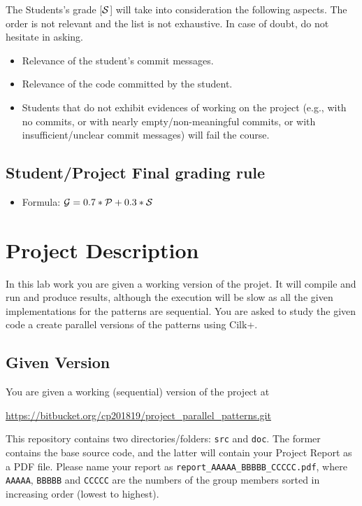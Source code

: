 \documentclass[11pt]{article}
\begin{document}
The Students's grade [$\cal{S}$] will take into consideration the following aspects.  The order is not relevant and the list is not exhaustive. In case of doubt, do not hesitate in asking.

\begin{itemize}
  \item Relevance of the student's commit messages.
  \item Relevance of the code committed by the student.
  \item Students that do not exhibit evidences of working on the project (e.g., with no commits, or with nearly empty/non-meaningful commits, or with insufficient/unclear commit messages) will fail the course.
\end{itemize}


\subsection{Student/Project Final grading rule}

\begin{itemize}
  \item Formula: ${\cal G} = 0.7 * {\cal P} + 0.3 * {\cal S}$
\end{itemize}


\section{Project Description}

In this lab work you are given a working version of the projet.  It will compile and run and produce results, although the execution will be slow as all the given implementations for the patterns are sequential.  You are asked to study the given code a create parallel versions of the patterns using Cilk+.

\subsection{Given Version}

You are given a working (sequential) version of the project at

\url{https://bitbucket.org/cp201819/project_parallel_patterns.git}


This repository contains two directories/folders: \verb!src! and \verb!doc!.  The former contains the base source code, and the latter will contain your Project Report as a PDF file.  Please name your report as \verb!report_AAAAA_BBBBB_CCCCC.pdf!, where \verb!AAAAA!,  \verb!BBBBB! and  \verb!CCCCC! are the numbers of the group members sorted in increasing order (lowest to highest).
\end{document}
